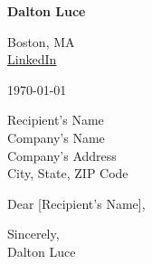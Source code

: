 \documentclass[letterpaper,10pt]{article}
\begin{document}

\begin{minipage}[t]{0.5\textwidth}
    \vspace*{\fill}
    \huge \textbf{Dalton Luce}
    \vspace*{\fill}
\end{minipage}\hfill
\begin{minipage}[t]{0.3\textwidth}
    \setlength{\baselineskip}{15pt}
    \RaggedLeft
    Boston, MA \\
    \href{https://www.linkedin.com/in/dalton-luce/}{\underline{LinkedIn}}
\end{minipage}

\vspace{10pt}

\noindent\hrulefill

\vspace{10pt}

\today

Recipient's Name \\
Company's Name \\
Company's Address \\
City, State, ZIP Code

Dear [Recipient's Name],

\lipsum[1-4]

Sincerely, \\
Dalton Luce

\end{document}
